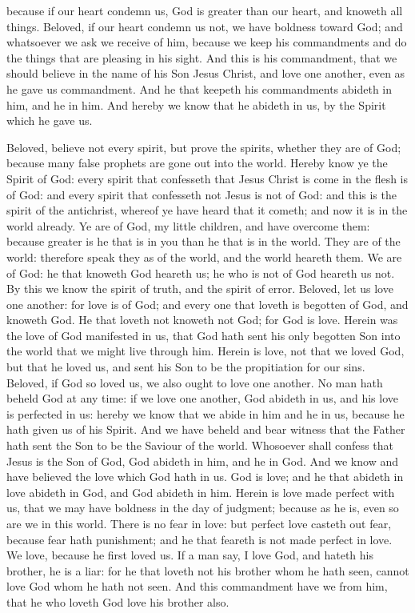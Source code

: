 because if our heart condemn us, God is greater than our heart, and knoweth all things. Beloved, if our heart condemn us not, we have boldness toward God; and whatsoever we ask we receive of him, because we keep his commandments and do the things that are pleasing in his sight. And this is his commandment, that we should believe in the name of his Son Jesus Christ, and love one another, even as he gave us commandment. And he that keepeth his commandments abideth in him, and he in him. And hereby we know that he abideth in us, by the Spirit which he gave us. 

Beloved, believe not every spirit, but prove the spirits, whether they are of God; because many false prophets are gone out into the world. Hereby know ye the Spirit of God: every spirit that confesseth that Jesus Christ is come in the flesh is of God: and every spirit that confesseth not Jesus is not of God: and this is the spirit of the antichrist, whereof ye have heard that it cometh; and now it is in the world already. Ye are of God, my little children, and have overcome them: because greater is he that is in you than he that is in the world. They are of the world: therefore speak they as of the world, and the world heareth them. We are of God: he that knoweth God heareth us; he who is not of God heareth us not. By this we know the spirit of truth, and the spirit of error.  Beloved, let us love one another: for love is of God; and every one that loveth is begotten of God, and knoweth God. He that loveth not knoweth not God; for God is love. Herein was the love of God manifested in us, that God hath sent his only begotten Son into the world that we might live through him. Herein is love, not that we loved God, but that he loved us, and sent his Son to be the propitiation for our sins. Beloved, if God so loved us, we also ought to love one another. No man hath beheld God at any time: if we love one another, God abideth in us, and his love is perfected in us: hereby we know that we abide in him and he in us, because he hath given us of his Spirit. And we have beheld and bear witness that the Father hath sent the Son to be the Saviour of the world. Whosoever shall confess that Jesus is the Son of God, God abideth in him, and he in God. And we know and have believed the love which God hath in us. God is love; and he that abideth in love abideth in God, and God abideth in him. Herein is love made perfect with us, that we may have boldness in the day of judgment; because as he is, even so are we in this world. There is no fear in love: but perfect love casteth out fear, because fear hath punishment; and he that feareth is not made perfect in love. We love, because he first loved us. If a man say, I love God, and hateth his brother, he is a liar: for he that loveth not his brother whom he hath seen, cannot love God whom he hath not seen. And this commandment have we from him, that he who loveth God love his brother also. 

